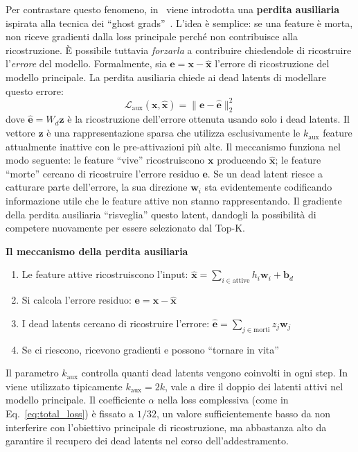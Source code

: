 Per contrastare questo fenomeno, in~\parencite{oneill2024disentangling} viene introdotta una \textbf{perdita ausiliaria} ispirata alla tecnica dei ``ghost grads''~\parencite{jermyn2023ghostgrads}. L'idea è semplice: se una feature è morta, non riceve gradienti dalla loss principale perché non contribuisce alla ricostruzione. È possibile tuttavia \textit{forzarla} a contribuire chiedendole di ricostruire l'\textit{errore} del modello.
Formalmente, sia $\mathbf{e} = \mathbf{x} - \hat{\mathbf{x}}$ l'errore di ricostruzione del modello principale. La perdita ausiliaria chiede ai dead latents di modellare questo errore:
\begin{equation}
    \mathcal{L}_{\text{aux}}(\mathbf{x}, \hat{\mathbf{x}}) = \|\mathbf{e} - \hat{\mathbf{e}}\|_2^2
    \label{eq:auxiliary_loss}
\end{equation}
dove $\hat{\mathbf{e}} = W_d \mathbf{z}$ è la ricostruzione dell'errore ottenuta usando solo i dead latents. Il vettore $\mathbf{z}$ è una rappresentazione sparsa che utilizza esclusivamente le $k_{\text{aux}}$ feature attualmente inattive con le pre-attivazioni più alte.
Il meccanismo funziona nel modo seguente: le feature ``vive'' ricostruiscono $\mathbf{x}$ producendo $\hat{\mathbf{x}}$; le feature ``morte'' cercano di ricostruire l'errore residuo $\mathbf{e}$. Se un dead latent riesce a catturare parte dell'errore, la sua direzione $\mathbf{w}_i$ sta evidentemente codificando informazione utile che le feature attive non stanno rappresentando. Il gradiente della perdita ausiliaria ``risveglia'' questo latent, dandogli la possibilità di competere nuovamente per essere selezionato dal Top-K.
\begin{notebox}
\textbf{Il meccanismo della perdita ausiliaria}\\
\begin{enumerate}
    \item Le feature attive ricostruiscono l'input: $\hat{\mathbf{x}} = \sum_{i \in \text{attive}} h_i \mathbf{w}_i + \mathbf{b}_d$
    \item Si calcola l'errore residuo: $\mathbf{e} = \mathbf{x} - \hat{\mathbf{x}}$
    \item I dead latents cercano di ricostruire l'errore: $\hat{\mathbf{e}} = \sum_{j \in \text{morti}} z_j \mathbf{w}_j$
    \item Se ci riescono, ricevono gradienti e possono ``tornare in vita''
\end{enumerate}
\end{notebox}
Il parametro $k_{\text{aux}}$ controlla quanti dead latents vengono coinvolti in ogni step. In~\parencite{oneill2024disentangling} viene utilizzato tipicamente $k_{\text{aux}} = 2k$, vale a dire il doppio dei latenti attivi nel modello principale. Il coefficiente $\alpha$ nella loss complessiva (come in Eq.~\ref{eq:total_loss}) è fissato a $1/32$, un valore sufficientemente basso da non interferire con l'obiettivo principale di ricostruzione, ma abbastanza alto da garantire il recupero dei dead latents nel corso dell'addestramento.
